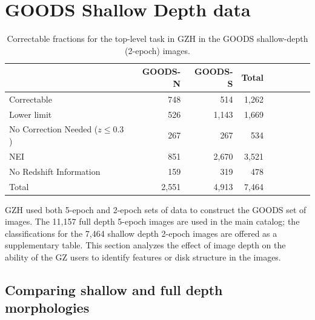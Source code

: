 \documentclass[twocolumn]{aastex6}
\begin{document}


\newpage
\clearpage

\appendix

\section{GOODS Shallow Depth data}


\begin{table}
\caption{Correctable fractions for the top-level task in GZH in the GOODS shallow-depth (2-epoch) images. \label{tbl:goods_shallow_categories}}
\begin{tabular}{lrrrrrrrr}
\hline\hline
                                   & GOODS-N & GOODS-S & Total \\
\hline
Correctable                        & 748     & 514     & 1,262 \\
Lower limit                        & 526     & 1,143   & 1,669 \\
No Correction Needed ($z \le 0.3$) & 267     & 267     & 534   \\ 
NEI                                & 851     & 2,670   & 3,521 \\
No Redshift Information            & 159     & 319     & 478   \\
Total                              & 2,551   & 4,913   & 7,464 \\
\hline\hline
\end{tabular}
\end{table}

GZH used both 5-epoch and 2-epoch sets of data to construct the GOODS set of images. The 11,157 full depth 5-epoch images are used in the main catalog; the classifications for the 7,464 shallow depth 2-epoch images are offered as a supplementary table. This section analyzes the effect of image depth on the ability of the GZ users to identify features or disk structure in the images. 

\subsection{Comparing shallow and full depth morphologies}
\end{document}
